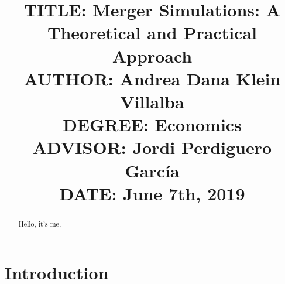 \documentclass[12pt]{article}
\begin{document}

\title{{\large TITLE: Merger Simulations: A Theoretical and Practical Approach\\
AUTHOR: Andrea Dana Klein Villalba\\
DEGREE: Economics\\
ADVISOR: Jordi Perdiguero Garc\'ia\\
DATE: June 7th, 2019\\}}
\date{}

\clearpage\maketitle
\thispagestyle{empty}
\newpage

\begin{abstract}
Hello, it's me,
\end{abstract}
\newpage

 \tableofcontents
 \newpage

\section{Introduction}
\end{document}

